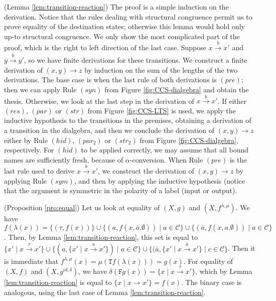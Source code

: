 \documentclass[orivec]{llncs}
\newcommand{\mF}[1]{\mathtt{#1}}
\newcommand{\F}{\mF{F}}
\newcommand{\T}{\mF{T}}
\newcommand{\id}{\mathit{id}}
\newcommand{\tr}[1]{\stackrel{#1}{\longrightarrow}}
\newcommand{\utr}{\to}
\newcommand{\chan}{\mathcal{C}}
\newcommand{\proend}{\medskip}
\renewenvironment{proof}{\begin{pro}}{\proend\end{pro}}
\begin{document}
\begin{proof}(Lemma \ref{lem:transition-reaction}) The proof is a simple induction on the derivation. Notice that the rules dealing with structural congruence permit us to prove equality of the destination states; otherwise this lemma would hold only up-to structural congruence. We only show the most complicated part of the proof, which is the right to left direction of the last case. Suppose $x \tr{b} x'$ and $y \tr {\bar b} y'$, so we have finite derivations for these transitions. We construct a finite derivation of $(x,y) \utr z$ by induction on the sum of the lengths of the two derivations. The base case is when the last rule of both derivations is $(pre)$; then we can apply Rule $(syn)$ from Figure \ref{fig:CCS-dialgebra} and obtain the thesis. Otherwise, we look at the last step in the derivation of $x \tr b x'$. If either $(res)$, $(par)$ or $(str)$ from Figure \ref{fig:CCS-LTS} is used, we apply the inductive hypothesis to the transitions in the premises, obtaining a derivation of a transition in the 
dialgebra, and then we conclude the derivation of $(x,y) \utr z$ either by Rule $(hid)$, $(par_2)$ or $(str_2)$ from Figure \ref{fig:CCS-dialgebra}, respectively. For $(hid)$ to be applied correctly, we may assume that all bound names are sufficiently fresh, because of $\alpha$-conversion. When Rule $(pre)$ is the last rule used to derive $x \tr b x'$, we construct the derivation of $(x,y) \utr z$ by applying Rule $(sym)$, and then by applying the inductive hypothesis (notice that the argument is symmetric in the polarity of a label (input or output).
\end{proof} 


\begin{proof}(Proposition \ref{pro:equal})
	Let us look at equality of $(X,g)$ and $(X,f^{\lambda,\mu})$.  We have $f(\lambda(x)) = \{ (\tau, f(x)) \} \cup \{ (a,f(x,\bar a . \emptyset)) \mid a \in \chan \} \cup \{(\bar a,f(x,a . \emptyset)) \mid a \in \chan \}$. Then, by Lemma \ref{lem:transition-reaction}, this set is equal to $\{ x' \mid x \tr{\tau} x' \} \cup \{(a,\{ x' \mid x \tr {a} x' \}) \mid a \in \chan \}\cup \{(\bar a,\{ x' \mid x \tr {\bar a} x' \} \mid c \in \chan \} $. Then it is immediate that $f^{\lambda,\mu}(x) = \mu(\T f(\lambda(x))) = g(x)$.
	For equality of $(X,f)$ and $(X,g^{\id,\delta})$, we have $\delta(\F g(x)) = \{ x \mid x \tr \tau x' \}$, which by Lemma \ref{lem:transition-reaction} is equal to $\{ x \mid x \utr x'\} = f(x)$. The binary case is analogous, using the last case of Lemma \ref{lem:transition-reaction}.
\end{proof}
\end{document}
